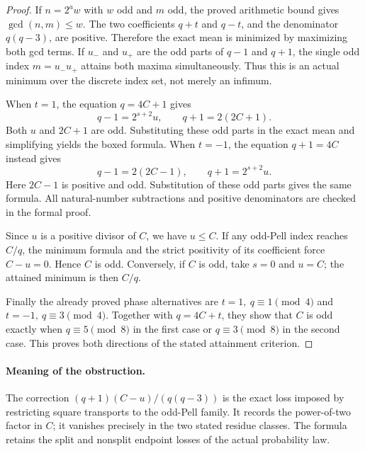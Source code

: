 \documentclass[11pt]{article}
\begin{document}
\begin{proof}
If \(n=2^a w\) with \(w\) odd and \(m\) odd, the proved arithmetic
bound gives \(\gcd(n,m)\le w\).
The two coefficients \(q+t\) and \(q-t\), and the denominator
\(q(q-3)\), are positive. Therefore the exact mean is minimized
by maximizing both gcd terms. If \(u_-\) and \(u_+\) are the odd
parts of \(q-1\) and \(q+1\), the single odd index
\(m=u_-u_+\) attains both maxima simultaneously. Thus this is an
actual minimum over the discrete index set, not merely an infimum.

When \(t=1\), the equation \(q=4C+1\) gives
\[
 q-1=2^{s+2}u,\qquad q+1=2(2C+1).
\]
Both \(u\) and \(2C+1\) are odd. Substituting these odd parts in the
exact mean and simplifying yields the boxed formula.
When \(t=-1\), the equation \(q+1=4C\) instead gives
\[
 q-1=2(2C-1),\qquad q+1=2^{s+2}u.
\]
Here \(2C-1\) is positive and odd. Substitution of these odd parts
gives the same formula. All natural-number subtractions and
positive denominators are checked in the formal proof.

Since \(u\) is a positive divisor of \(C\), we have \(u\le C\).
If any odd-Pell index reaches \(C/q\), the minimum formula and
the strict positivity of its coefficient force \(C-u=0\).
Hence \(C\) is odd. Conversely, if \(C\) is odd, take \(s=0\)
and \(u=C\); the attained minimum is then \(C/q\).

Finally the already proved phase alternatives are
\(t=1,\ q\equiv1\pmod4\) and \(t=-1,\ q\equiv3\pmod4\).
Together with \(q=4C+t\), they show that \(C\) is odd exactly
when \(q\equiv5\pmod8\) in the first case or
\(q\equiv3\pmod8\) in the second case. This proves both directions
of the stated attainment criterion.
\end{proof}

\paragraph{Meaning of the obstruction.}
The correction \( (q+1)(C-u)/(q(q-3)) \) is the exact loss imposed
by restricting square transports to the odd-Pell family.
It records the power-of-two factor in \(C\); it vanishes precisely
in the two stated residue classes. The formula retains the split
and nonsplit endpoint losses of the actual probability law.
\end{document}
